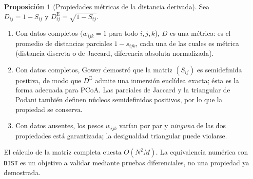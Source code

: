 \documentclass[11pt,a4paper]{article}
\theoremstyle{definition}
\newtheorem{proposicion}{Proposición}[section]
\theoremstyle{remark}
\begin{document}
\begin{proposicion}[Propiedades métricas de la distancia derivada]
Sea $D_{ij} = 1 - S_{ij}$ y $D^{\text{E}}_{ij} = \sqrt{1 - S_{ij}}$.
\begin{enumerate}
    \item Con datos completos ($w_{ijk} = 1$ para todo $i, j, k$), $D$ es una métrica: es el promedio de distancias parciales $1 - s_{ijk}$, cada una de las cuales es métrica (distancia discreta o de Jaccard, diferencia absoluta normalizada).
    \item Con datos completos, Gower \cite{gower1971} demostró que la matriz $(S_{ij})$ es semidefinida positiva, de modo que $D^{\text{E}}$ admite una inmersión euclídea exacta; ésta es la forma adecuada para PCoA. Las parciales de Jaccard y la triangular de Podani también definen núcleos semidefinidos positivos, por lo que la propiedad se conserva.
    \item Con datos ausentes, los pesos $w_{ijk}$ varían por par y \emph{ninguna} de las dos propiedades está garantizada; la desigualdad triangular puede violarse.
\end{enumerate}
\end{proposicion}

El cálculo de la matriz completa cuesta $O(N^2 M)$. La equivalencia numérica con \texttt{DIST} es un objetivo a validar mediante pruebas diferenciales, no una propiedad ya demostrada.
\end{document}
